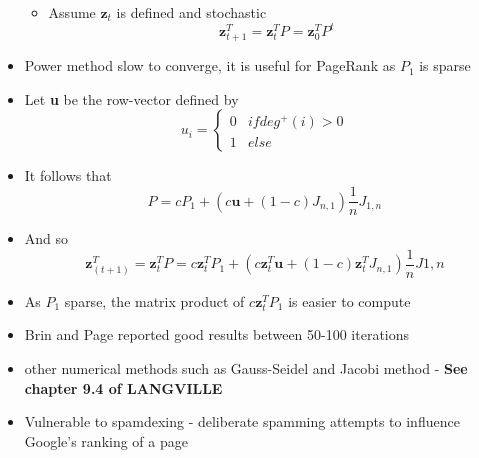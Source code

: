 \documentclass[11pt]{report}
\begin{document}
\begin{itemize}
\begin{itemize}
\item Assume $\textbf{z}_t$ is defined and stochastic
\begin{equation}
\textbf{z}_{t+1}^T = \textbf{z}_{t}^TP = \textbf{z}_{0}^TP^t
\end{equation}
\end{itemize}
\item Power method slow to converge, it is useful for PageRank as $P_1$ is sparse
\item Let \textbf{u} be the row-vector defined by \begin{equation} u_i =\begin{cases} 0& if deg^+(i) >0 \\ 1 & else\end{cases}\end{equation}
\item It follows that \begin{equation}P=cP_1 +(c\textbf{u} +(1-c)J_{n,1})\frac{1}{n}J_{1,n}\end{equation}
\item And so \begin{equation}
\textbf{z}^T_{(t+1)} = \textbf{z}_t^TP=c\textbf{z}^T_tP_1 +(c\textbf{z}^T_t\textbf{u} +(1-c)\textbf{z}^T_tJ_{n,1})\frac{1}{n}J{1,n}
\end{equation}
\item As $P_1$ sparse, the matrix product of $c\textbf{z}^T_tP_1$ is easier to compute
\item Brin and Page reported good results between 50-100 iterations
\item other numerical methods such as Gauss-Seidel and Jacobi method - \textbf{See chapter 9.4 of LANGVILLE}
\item Vulnerable to spamdexing - deliberate spamming attempts to influence Google's ranking of a page
\end{itemize}
\end{document}
